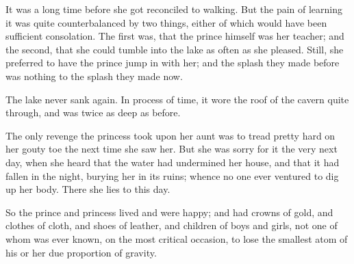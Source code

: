 \documentclass[12pt]{memoir}
\begin{document}
It was a long time before she got reconciled to walking.  But the pain
of learning it was quite counterbalanced by two things, either of
which would have been sufficient consolation.  The first was, that the
prince himself was her teacher; and the second, that she could tumble
into the lake as often as she pleased.  Still, she preferred to have
the prince jump in with her; and the splash they made before was
nothing to the splash they made now.

The lake never sank again.  In process of time, it wore the roof of
the cavern quite through, and was twice as deep as before.

The only revenge the princess took upon her aunt was to tread pretty
hard on her gouty toe the next time she saw her.  But she was sorry
for it the very next day, when she heard that the water had undermined
her house, and that it had fallen in the night, burying her in its
ruins; whence no one ever ventured to dig up her body.  There she lies
to this day.

So the prince and princess lived and were happy; and had crowns of
gold, and clothes of cloth, and shoes of leather, and children of boys
and girls, not one of whom was ever known, on the most critical
occasion, to lose the smallest atom of his or her due proportion of
gravity.
\end{document}
